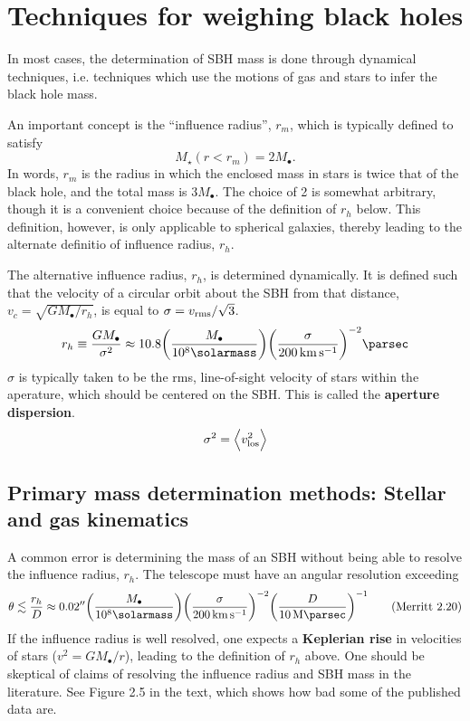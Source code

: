 \documentclass[degn-notes.tex]{subfiles}
\begin{document}
\section{Techniques for weighing black holes}

In most cases, the determination of SBH mass is done through dynamical techniques, i.e. techniques which use the motions of gas and stars to infer the black hole mass.

An important concept is the ``influence radius'', $r_m$, which is typically defined to satisfy
%
\begin{displaymath}
  M_\star(r < r_m) = 2 M_\bullet.
%
  \tag{Merritt 2.11}
  \label{merritt:2.11}
\end{displaymath}
%
In words, $r_m$ is the radius in which the enclosed mass in stars is twice that of the black hole, and the total mass is $3 M_\bullet$. The choice of 2 is somewhat arbitrary, though it is a convenient choice because of the definition of $r_h$ below. This definition, however, is only applicable to spherical galaxies, thereby leading to the alternate definitio of influence radius, $r_h$.

The alternative influence radius, $r_h$, is determined dynamically. It is defined such that the velocity of a circular orbit about the SBH from that distance, $v_c = \sqrt{G M_\bullet / r_h}$, is equal to $\sigma = v_{\rm rms} / \sqrt{3}$.
%
\begin{displaymath}
  r_h \equiv
  \frac{G M_\bullet}{\sigma^2} \approx
  10.8 \qty(\frac{M_\bullet}{10^8 \si{\solarmass}})
       \qty(\frac{\sigma}{\SI{200}{\kilo\meter\per\second}})^{-2} \si{\parsec}
\end{displaymath}
%
$\sigma$ is typically taken to be the rms, line-of-sight velocity of stars within the aperature, which should be centered on the SBH. This is called the \textbf{aperture dispersion}.
%
\begin{displaymath}
  \sigma^2 = \expval{v_{\rm los}^2}
\end{displaymath}


\subsection{Primary mass determination methods: Stellar and gas kinematics}

A common error is determining the mass of an SBH without being able to resolve the influence radius, $r_h$. The telescope must have an angular resolution exceeding
%
\begin{displaymath}
  \theta \lesssim
  \frac{r_h}{D} \approx
  0.02'' \qty(\frac{M_\bullet}{10^8 \si{\solarmass}})
         \qty(\frac{\sigma}{\SI{200}{\kilo\meter\per\second}})^{-2}
         \qty(\frac{D}{\SI{10}{\mega\parsec}})^{-1}
%
  \tag{Merritt 2.20}
  \label{merritt:2.20}
\end{displaymath}
%
If the influence radius is well resolved, one expects a \textbf{Keplerian rise} in velocities of stars ($v^2 = G M_\bullet / r$), leading to the definition of $r_h$ above. One should be skeptical of claims of resolving the influence radius and SBH mass in the literature. See Figure 2.5 in the text, which shows how bad some of the published data are.
\end{document}
